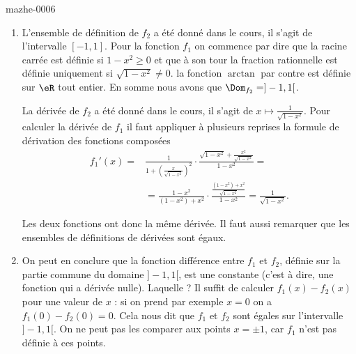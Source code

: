 

\begin{corrige}{mazhe-0006}

  \begin{enumerate}
  \item L'ensemble de définition de $f_2$ a été donné dans le cours, il s'agit de l'intervalle $[-1,1]$. Pour la fonction $f_1$ on commence par dire que la racine carrée est définie si $1-x^2 \geq 0$ et que à son tour la fraction rationnelle est définie uniquement si $\sqrt{1-x^2}\neq 0$. la fonction $\arctan$ par contre est définie sur $\eR$ tout entier. En somme nous avons que $\Dom_{f_2} = ]-1,1[$.

La dérivée de  $f_2$ a été donné dans le cours, il s'agit de $\displaystyle x\mapsto \frac{1}{\sqrt{1-x^2}}$. Pour calculer la dérivée de $f_1$ il faut appliquer à plusieurs reprises la formule de dérivation des fonctions composées
\begin{equation*}
  \begin{aligned}
    f_1' (x) = &\frac{1}{1+\left(\frac{x}{\sqrt{1-x^2}}\right)^2} \cdot \frac{\sqrt{1-x^2} + \frac{x^2}{\sqrt{1-x^2}}}{1-x^2} = \\
    &= \frac{1-x^2}{(1-x^2) +x^2}\cdot\frac{\frac{(1-x^2) +x^2}{\sqrt{1-x^2}}}{1-x^2} =\frac{1}{\sqrt{1-x^2}}.
  \end{aligned}
\end{equation*}

Les deux fonctions ont donc la m\^eme dérivée. Il faut aussi remarquer que les ensembles de définitions de dérivées sont égaux. 
  \item On peut en conclure que la fonction différence entre $f_1$ et $f_2$, définie sur la partie commune du domaine $]-1,1[$,  est une constante (c'est à dire, une fonction qui a dérivée nulle). Laquelle ? Il suffit de calculer $f_1(x)-f_2(x)$ pour une valeur de $x$ : si on prend par exemple $x =0$ on a $f_1(0) -f_2(0) =0$. Cela nous dit que $f_1$ et $f_2$ sont égales sur l'intervalle $]-1,1[$. On ne peut pas les comparer aux points $x = \pm 1$, car $f_1$ n'est pas définie à ces points.
  \end{enumerate}
\end{corrige}
